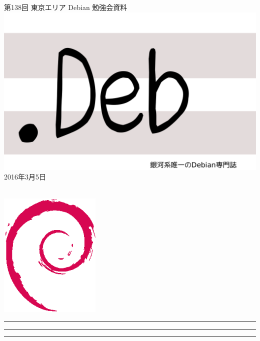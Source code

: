 \documentclass[mingoth,a4paper]{jsarticle}
\newcommand{\debmtgyear}{2016}
\newcommand{\debmtgmonth}{3}
\newcommand{\debmtgdate}{5}
\newcommand{\debmtgnumber}{138}
\begin{document}
\begin{titlepage}
\thispagestyle{empty}

\vspace*{-2cm}
第\debmtgnumber{}回 東京エリア Debian 勉強会資料\\
\hspace*{-2cm}
\includegraphics{image2012-natsu/dotdeb.pdf}\\
\hfill{}\debmtgyear{}年\debmtgmonth{}月\debmtgdate{}日

\\

\vspace*{-2cm}
\hfill{}\includegraphics[height=6cm]{image200502/openlogo-nd.eps}
\end{titlepage}

\newpage

\begin{minipage}[b]{0.2\hsize}
 \colorbox{titleback}{}
\end{minipage}
\begin{minipage}[b]{0.8\hsize}
\hrule
\vspace{2mm}
\hrule
\begin{multicols}{2}
\tableofcontents
\end{multicols}
\vspace{2mm}
\hrule
\end{minipage}
\end{document}
